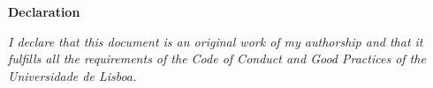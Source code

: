 
\thispagestyle{empty}
\vspace*{\fill}

\begin{flushright}
    \begin{Large}
    \textbf{Declaration} \\ \bigskip
    \end{Large}
    \textit{I declare that this document is an original work of my authorship and that it fulfills all the requirements of the Code of Conduct and Good Practices of the Universidade de Lisboa.}
\end{flushright}